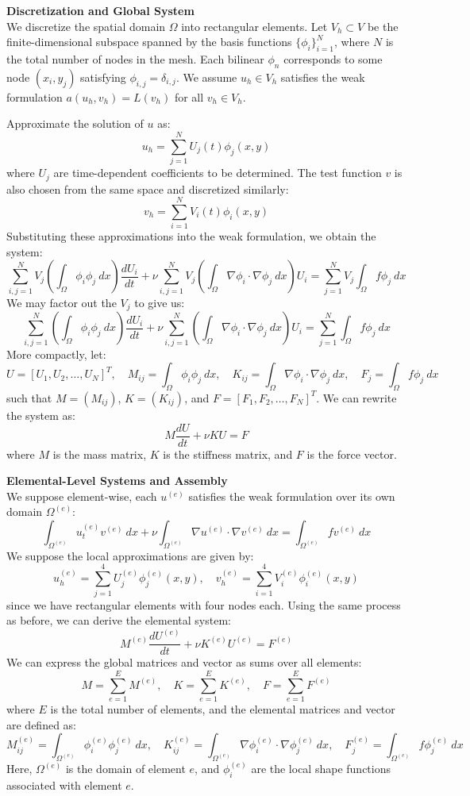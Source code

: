 \documentclass[12pt]{article}
\begin{document}
\vspace{1em}
{\large \textbf{Discretization and Global System}} \\
We discretize the spatial domain $\Omega$ into rectangular elements. Let $V_h \subset V$ be the finite-dimensional subspace spanned by the basis functions $\{\phi_i\}_{i=1}^{N}$, where $N$ is the total number of nodes in the mesh. Each bilinear $\phi_n$ corresponds to some node $(x_i, y_j)$ satisfying $\phi_{i,j} = \delta_{i,j}$. We assume $u_h\in V_h$ satisfies the weak formulation $a(u_h,v_h) = L(v_h)$ for all $v_h \in V_h$.

Approximate the solution of $u$ as:
\[u_h = \sum_{j=1}^{N} U_j(t) \phi_j(x,y)\]
where $U_j$ are time-dependent coefficients to be determined. The test function $v$ is also chosen from the same space and discretized similarly:
\[v_h = \sum_{i=1}^{N} V_i(t) \phi_i(x,y)\]
Substituting these approximations into the weak formulation, we obtain the system:
\[\sum_{i,j=1}^{N} V_j \left( \int_{\Omega} \phi_i \phi_j \ dx \right) \frac{dU_i}{dt} + \nu \sum_{i,j=1}^{N} V_j \left( \int_{\Omega} \nabla \phi_i \cdot \nabla \phi_j \ dx \right) U_i = \sum_{j=1}^{N}V_j\int_{\Omega} f \phi_j \ dx\]
We may factor out the $V_j$ to give us: 
\[\sum_{i,j=1}^{N} \left( \int_{\Omega} \phi_i \phi_j \ dx \right) \frac{dU_i}{dt} + \nu \sum_{i,j=1}^{N}  \left( \int_{\Omega} \nabla \phi_i \cdot \nabla \phi_j \ dx \right) U_i = \sum_{j=1}^{N}\int_{\Omega} f \phi_j \ dx\] 
More compactly, let:
\[ U = [U_1, U_2, \ldots, U_N]^T, \quad M_{ij} = \int_{\Omega} \phi_i \phi_j \ dx, \quad K_{ij} = \int_{\Omega} \nabla \phi_i \cdot \nabla \phi_j \ dx, \quad F_j = \int_{\Omega} f \phi_j \ dx\]
such that $M = (M_{ij})$, $K = (K_{ij})$, and $F = [F_1, F_2, \ldots, F_N]^T$.
We can rewrite the system as:
\[M \frac{dU}{dt} + \nu K U = F\]
where $M$ is the mass matrix, $K$ is the stiffness matrix, and $F$ is the force vector.

\vspace{1em}
{\large \textbf{Elemental-Level Systems and Assembly}} \\
We suppose element-wise, each $u^{(e)}$ satisfies the weak formulation over its own domain $\Omega^{(e)}$:
\[\int_{\Omega^{(e)}} u_t^{(e)} v^{(e)} \ dx + \nu \int_{\Omega^{(e)}} \nabla u^{(e)} \cdot \nabla v^{(e)} \ dx = \int_{\Omega^{(e)}} f v^{(e)} \ dx\]
We suppose the local approximations are given by:
\[u_h^{(e)} = \sum_{j=1}^{4} U_j^{(e)} \phi_j^{(e)}(x,y), \quad v_h^{(e)} = \sum_{i=1}^{4} V_i^{(e)} \phi_i^{(e)}(x,y)\]
since we have rectangular elements with four nodes each.
Using the same process as before, we can derive the elemental system:
\[M^{(e)} \frac{dU^{(e)}}{dt} + \nu K^{(e)} U^{(e)} = F^{(e)}\]
We can express the global matrices and vector as sums over all elements:
\[M = \sum_{e=1}^{E} M^{(e)}, \quad K = \sum_{e=1}^{E} K^{(e)}, \quad F = \sum_{e=1}^{E} F^{(e)}\]
where $E$ is the total number of elements, and the elemental matrices and vector are defined as:
\[M_{ij}^{(e)} = \int_{\Omega^{(e)}} \phi_i^{(e)} \phi_j^{(e)} \ dx, \quad K_{ij}^{(e)} = \int_{\Omega^{(e)}} \nabla \phi_i^{(e)} \cdot \nabla \phi_j^{(e)} \ dx, \quad F_j^{(e)} = \int_{\Omega^{(e)}} f \phi_j^{(e)} \ dx\]
Here, $\Omega^{(e)}$ is the domain of element $e$, and $\phi_i^{(e)}$ are the local shape functions associated with element $e$.
\end{document}
